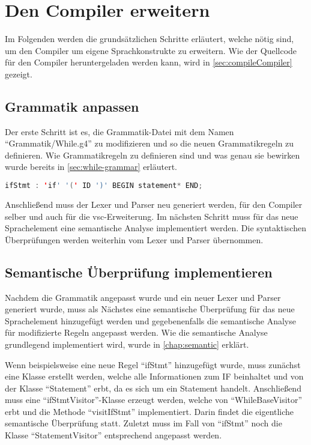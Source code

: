 \section{Den Compiler erweitern} 

Im Folgenden werden die grundsätzlichen Schritte erläutert, welche nötig sind, um den Compiler um eigene Sprachkonstrukte zu erweitern. Wie der Quellcode für den Compiler heruntergeladen werden kann, wird in \cref{sec:compileCompiler} gezeigt.

\subsection{Grammatik anpassen}
Der erste Schritt ist es, die Grammatik-Datei mit dem Namen \enquote{Grammatik/While.g4} zu modifizieren und so die neuen Grammatikregeln zu definieren. Wie Grammatikregeln zu definieren sind und was genau sie bewirken wurde bereits in \cref{sec:while-grammar} erläutert.  

\begin{lstlisting}[language=java, caption=Grammatikregel für ein IF, label={lst:howto-grammar-if}]
ifStmt : 'if' '(' ID ')' BEGIN statement* END;
\end{lstlisting}

Anschließend muss der Lexer und Parser neu generiert werden, für den Compiler selber und auch für die \ac{vsc}-Erweiterung. Im nächsten Schritt muss für das neue Sprachelement eine semantische Analyse implementiert werden. Die syntaktischen Überprüfungen werden weiterhin vom Lexer und Parser übernommen.


\subsection{Semantische Überprüfung implementieren}
Nachdem die Grammatik angepasst wurde und ein neuer Lexer und Parser generiert wurde, muss als Nächstes eine semantische Überprüfung für das neue Sprachelement hinzugefügt werden und gegebenenfalls die semantische Analyse für modifizierte Regeln angepasst werden. Wie die semantische Analyse grundlegend implementiert wird, wurde in \cref{chap:semantic} erklärt.

Wenn beispielsweise eine neue Regel \enquote{ifStmt} hinzugefügt wurde, muss zunächst eine Klasse erstellt werden, welche alle Informationen zum IF beinhaltet und von der Klasse \enquote{Statement} erbt, da es sich um ein Statement handelt. Anschließend muss eine \enquote{ifStmtVisitor}-Klasse erzeugt werden, welche von \enquote{WhileBaseVisitor} erbt und die Methode \enquote{visitIfStmt} implementiert. Darin findet die eigentliche semantische Überprüfung statt. Zuletzt muss im Fall von \enquote{ifStmt} noch die Klasse \enquote{StatementVisitor} entsprechend angepasst werden.

